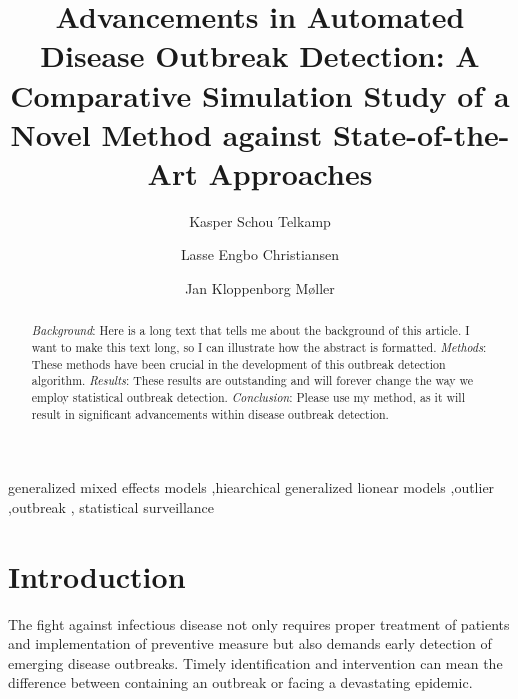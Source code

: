 \documentclass[preprint, 3p,
authoryear]{elsarticle} %
\begin{document}
\begin{frontmatter}

  \title{Advancements in Automated Disease Outbreak Detection: A
Comparative Simulation Study of a Novel Method against State-of-the-Art
Approaches}
    \author[Epidemiology Research]{Kasper Schou Telkamp%
  }
    \author[Epidemiology Research]{Lasse Engbo Christiansen%
  }
    \author[Department of Applied Mathematics and Computer Science]{Jan
Kloppenborg Møller%
  }
  
  \begin{abstract}
  \emph{Background}: Here is a long text that tells me about the
  background of this article. I want to make this text long, so I can
  illustrate how the abstract is formatted. \emph{Methods}: These
  methods have been crucial in the development of this outbreak
  detection algorithm. \emph{Results}: These results are outstanding and
  will forever change the way we employ statistical outbreak detection.
  \emph{Conclusion}: Please use my method, as it will result in
  significant advancements within disease outbreak detection.
  \end{abstract}
    \begin{keyword}
    generalized mixed effects models \sep hiearchical generalized
lionear models \sep outlier \sep outbreak \sep 
    statistical surveillance
  \end{keyword}
  
 \end{frontmatter}

\hypertarget{introduction}{%
\section{Introduction}\label{introduction}}

The fight against infectious disease not only requires proper treatment
of patients and implementation of preventive measure but also demands
early detection of emerging disease outbreaks. Timely identification and
intervention can mean the difference between containing an outbreak or
facing a devastating epidemic.
\end{document}

